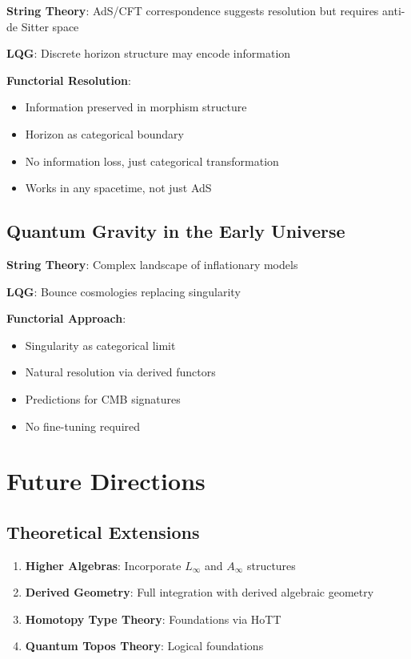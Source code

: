 \documentclass[11pt,a4paper]{article}
\begin{document}
\textbf{String Theory}: AdS/CFT correspondence suggests resolution but requires anti-de Sitter space

\textbf{LQG}: Discrete horizon structure may encode information

\textbf{Functorial Resolution}:
\begin{itemize}
    \item Information preserved in morphism structure
    \item Horizon as categorical boundary
    \item No information loss, just categorical transformation
    \item Works in any spacetime, not just AdS
\end{itemize}

\subsection{Quantum Gravity in the Early Universe}

\textbf{String Theory}: Complex landscape of inflationary models

\textbf{LQG}: Bounce cosmologies replacing singularity

\textbf{Functorial Approach}:
\begin{itemize}
    \item Singularity as categorical limit
    \item Natural resolution via derived functors
    \item Predictions for CMB signatures
    \item No fine-tuning required
\end{itemize}

\section{Future Directions}

\subsection{Theoretical Extensions}

\begin{enumerate}
    \item \textbf{Higher Algebras}: Incorporate $L_\infty$ and $A_\infty$ structures
    \item \textbf{Derived Geometry}: Full integration with derived algebraic geometry
    \item \textbf{Homotopy Type Theory}: Foundations via HoTT
    \item \textbf{Quantum Topos Theory}: Logical foundations
\end{enumerate}
\end{document}
